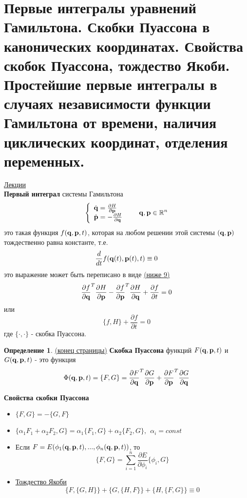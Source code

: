 \documentclass[specialist, subf, href, colorlinks=true, 12pt, times, mtpro, final]{disser}
\theoremstyle{definition}
\newtheorem{defn}{Определение}[section]
\begin{document}
    \section{Первые интегралы уравнений Гамильтона. Скобки Пуассона в канонических координатах. Свойства скобок Пуассона, тождество Якоби. Простейшие первые интегралы в случаях независимости функции Гамильтона от времени, наличия циклических координат, отделения переменных.}
     \label{14}
    \hyperlink {lects.17}{Лекции} \\
    \textbf{Первый интеграл} системы Гамильтона 
    $$
    \left\{
    \begin{array}{l}
    \dot{\mathbf{q}} = \frac{\partial H}{\partial \mathbf{p}} \\
    \dot{\mathbf{p}} = -\frac{\partial H}{\partial \mathbf{q}}
    \end{array}
    \right. \ \ \ \ \ \mathbf{q}, \mathbf{p} \in \mathbb{R}^n
    $$
    это такая функция $f(\mathbf{q},\mathbf{p},t)$, которая на любом решении этой системы $(\mathbf{q},\mathbf{p})$ тождественно равна константе, т.е. 
    $$
    	\frac{d}{dt} f(\mathbf{q} (t),\mathbf{p} (t),t) \equiv 0
    $$
    это выражение может быть переписано в виде \hyperlink {lects.17}{(ниже 9)}
    $$
    	\frac{\partial f}{\partial \mathbf{q}}^T \frac{\partial H}{\partial \mathbf{p}} - \frac{\partial f}{\partial \mathbf{p}}^T \frac{\partial H}{\partial \mathbf{q}} + \frac{\partial f}{\partial t} = 0
    $$
    или 
    $$
    	\{f,H\} + \frac{\partial f}{\partial t} = 0
    $$
    где $\{\cdot, \cdot\}$ - скобка Пуассона.
    \begin{defn}
    	\hyperlink {lects.17}{(конец страницы)} \textbf{Скобка Пуассона} функций $F(\mathbf{q}, \mathbf{p}, t)$ и $G(\mathbf{q}, \mathbf{p}, t)$ - это функция
    	$$
    		\Phi (\mathbf{q}, \mathbf{p}, t) = \{F,G\} = \frac{\partial F}{\partial \mathbf{q}}^T \frac{\partial G}{\partial \mathbf{p}} + \frac{\partial F}{\partial \mathbf{p}}^T \frac{\partial G}{\partial \mathbf{q}}
    	$$ 
    \end{defn}
	\textbf{Свойства скобки Пуассона}
	\begin{itemize}
		\item $\{F,G\} = - \{G,F\}$
		\item $\{\alpha_1 F_1 + \alpha_2 F_2, G\} = \alpha_1 \{F_1, G\} + \alpha_2 \{F_2, G\}, \ \ \alpha_i = const$
		\item Если $F = E(\phi_1(\mathbf{q}, \mathbf{p}, t), ..., \phi_n(\mathbf{q}, \mathbf{p}, t))$, то
			$$
				\{F,G\} = \sum\limits_{i = 1}^n \frac{\partial E}{\partial \phi_i} \{\phi_i, G\}
			$$
		\item \hyperlink {lects.18}{Тождество Якоби}
			$$
				\{F, \{G, H\} \} + \{G, \{H, F\} \} + \{H, \{F, G\} \} \equiv 0
			$$
	\end{itemize}  
\end{document}
